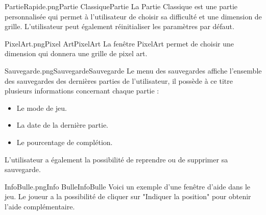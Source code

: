 \pagebreak
\begin{maquette}{PartieRapide.png}{Partie Classique}{Partie}
	La Partie Classique est une partie personnalisée qui permet à l'utilisateur de choisir sa difficulté et une dimension de grille. L'utilisateur peut également réinitialiser les paramètres par défaut.
\end{maquette}

\begin{maquette}{PixelArt.png}{Pixel Art}{PixelArt}
	La fenêtre PixelArt permet de choisir une dimension qui donnera une grille de pixel art. 
\end{maquette}

\pagebreak
\begin{maquette}{Sauvegarde.png}{Sauvegarde}{Sauvegarde}
    Le menu des sauvegardes affiche l'ensemble des sauvegardes des dernières parties de l'utilisateur, il possède à ce titre plusieurs informations concernant chaque partie : 
    \begin{itemize}
        \item Le mode de jeu.
        \item La date de la dernière partie.
        \item Le pourcentage de complétion.
    \end{itemize}
    L'utilisateur a également la possibilité de reprendre ou de supprimer sa sauvegarde.
\end{maquette}

\begin{maquette}{InfoBulle.png}{Info Bulle}{InfoBulle}
    Voici un exemple d'une fenêtre d'aide dans le jeu. Le joueur a la possibilité de cliquer sur "Indiquer la position" pour obtenir l'aide complémentaire.
\end{maquette}